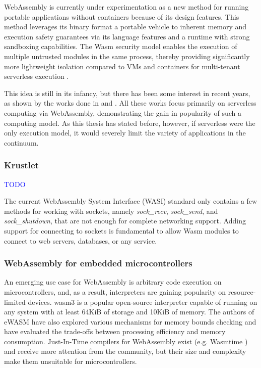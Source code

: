 WebAssembly is currently under experimentation as a new method for running portable applications without containers because of its design features. This method leverages its binary format a portable vehicle to inherent memory and execution safety guarantees via its language features and a runtime with strong sandboxing capabilities. The Wasm security model enables the execution of multiple untrusted modules in the same process, thereby providing significantly more lightweight isolation compared to VMs and containers for multi-tenant serverless execution \cite{sledge}.

This idea is still in its infancy, but there has been some interest in recent years, as shown by the works done in \cite{execution-model-serverless-edge} and \cite{faasm}. All these works focus primarily on serverless computing via WebAssembly, demonstrating the gain in popularity of such a computing model. As this thesis has stated before, however, if serverless were the only execution model, it would severely limit the variety of applications in the continuum.

\subsubsection{Krustlet}

\textcolor{blue}{TODO}

The current WebAssembly System Interface (WASI) standard only contains a few methods for working with sockets, namely \emph{sock\_recv}, \emph{sock\_send}, and \emph{sock\_shutdown}, that are not enough for complete networking support. Adding support for connecting to sockets is fundamental to allow Wasm modules to connect to web servers, databases, or any service.

\subsubsection{WebAssembly for embedded microcontrollers}

An emerging use case for WebAssembly is arbitrary code execution on microcontrollers, and, as a result, interpreters are gaining popularity on resource-limited devices. wasm3 \cite{wasm3} is a popular open-source interpreter capable of running on any system with at least 64KiB of storage and 10KiB of memory. The authors of eWASM \cite{ewasm} have also explored various mechanisms for memory bounds checking and have evaluated the trade-offs between processing efficiency and memory consumption. Just-In-Time compilers for WebAssembly exist (e.g. Wasmtime \cite{wasmtime}) and receive more attention from the community, but their size and complexity make them unsuitable for microcontrollers.

